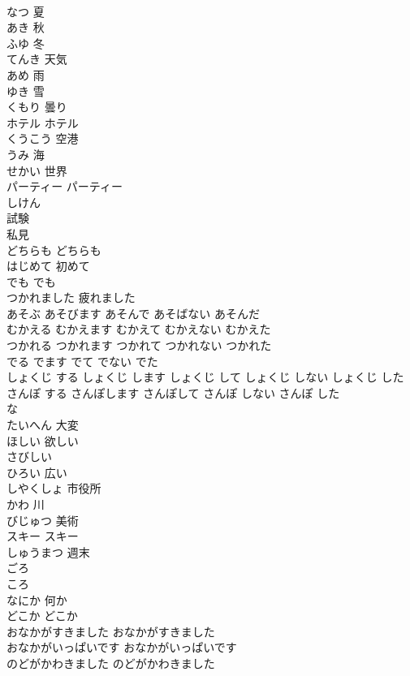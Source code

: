\documentclass[8pt]{extreport}
\begin{document}
\begin{CJK}{UTF8}{min}
\\	なつ	夏
\\	あき	秋
\\	ふゆ	冬
\\	てんき	天気
\\	あめ	雨
\\	ゆき	雪
\\	くもり	曇り
\\	ホテル	ホテル
\\	くうこう	空港
\\	うみ	海
\\	せかい	世界
\\	パーティー	パーティー
\\	しけん	
\\	試験 
\\	私見
\\	どちらも	どちらも
\\	はじめて	初めて
\\	でも	でも
\\	つかれました	疲れました
\\	あそぶ	あそびます	あそんで	あそばない	あそんだ	
\\	むかえる	むかえます	むかえて	むかえない	むかえた	
\\	つかれる	つかれます	つかれて	つかれない	つかれた	
\\	でる	でます	でて	でない	でた	
\\	しょくじ する	しょくじ します	しょくじ して	しょくじ しない	しょくじ した	
\\	さんぽ する	さんぽします	さんぽして	さんぽ しない	さんぽ した	
\\	な 
\\	たいへん	大変
\\	ほしい	欲しい
\\	さびしい	
\\	ひろい	広い
\\	しやくしょ	市役所
\\	かわ	川
\\	びじゅつ	美術
\\	スキー	スキー
\\	しゅうまつ	週末
\\	ごろ	
\\	ころ
\\	なにか	何か
\\	どこか	どこか
\\	おなかがすきました	おなかがすきました
\\	おなかがいっぱいです	おなかがいっぱいです
\\	のどがかわきました	のどがかわきました

\end{CJK}
\end{document}
